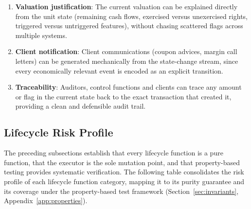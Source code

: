\documentclass[11pt,a4paper]{article}
\begin{document}
\begin{enumerate}
\item \textbf{Valuation justification}: The current valuation can be explained directly from the unit state (remaining cash flows, exercised versus unexercised rights, triggered versus untriggered features), without chasing scattered flags across multiple systems.
\item \textbf{Client notification}: Client communications (coupon advices, margin call letters) can be generated mechanically from the state-change stream, since every economically relevant event is encoded as an explicit transition.
\item \textbf{Traceability}: Auditors, control functions and clients can trace any amount or flag in the current state back to the exact transaction that created it, providing a clean and defensible audit trail.
\end{enumerate}

\subsection{Lifecycle Risk Profile}
\label{sec:risk-profile}

The preceding subsections establish that every lifecycle function is a pure function, that the executor is the sole mutation point, and that property-based testing provides systematic verification. The following table consolidates the risk profile of each lifecycle function category, mapping it to its purity guarantee and its coverage under the property-based test framework (Section~\ref{sec:invariants}, Appendix~\ref{app:properties}).
\end{document}
